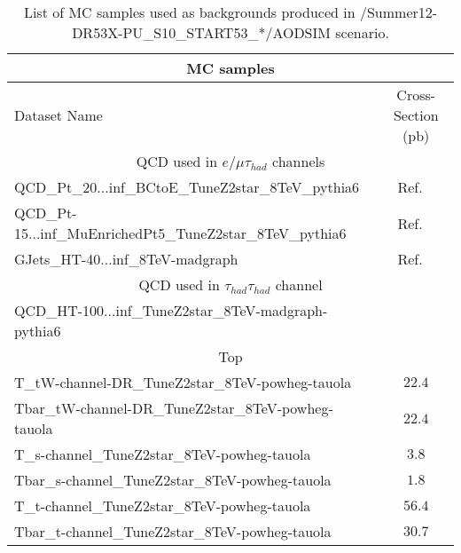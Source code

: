 \begin{table}[!Hhtb]
\begin{center}
\small{
\caption{List of MC samples used as backgrounds produced in /Summer12-DR53X-PU\_S10\_START53\_*/AODSIM scenario.}
\begin{tabular}{|l|c|}
\hline\hline
\multicolumn{2}{|c|}{MC samples } \\
\hline\hline
Dataset Name                                            & Cross-Section (pb)    \\
\hline\hline
\multicolumn{2}{|c|}{QCD used in $e/\mu\tau_{had}$ channels }\\
\hline\hline
QCD\_Pt\_20...inf\_BCtoE\_TuneZ2star\_8TeV\_pythia6                & Ref. ~\cite{Prep}\\ 
QCD\_Pt-15...inf\_MuEnrichedPt5\_TuneZ2star\_8TeV\_pythia6         & Ref. ~\cite{Prep}\\
GJets\_HT-40...inf\_8TeV-madgraph                                  & Ref. ~\cite{Prep}\\
\hline\hline
\multicolumn{2}{|c|}{QCD used in $\tau_{had}\tau_{had}$ channel }\\
\hline\hline
QCD\_HT-100...inf\_TuneZ2star\_8TeV-madgraph-pythia6            &\\
\hline\hline

\multicolumn{2}{|c|}{Top }\\
\hline\hline
T\_tW-channel-DR\_TuneZ2star\_8TeV-powheg-tauola       & $22.4$                \\
Tbar\_tW-channel-DR\_TuneZ2star\_8TeV-powheg-tauola    & $22.4$\\
T\_s-channel\_TuneZ2star\_8TeV-powheg-tauola           & $3.8$\\%
Tbar\_s-channel\_TuneZ2star\_8TeV-powheg-tauola        & $1.8$\\%
T\_t-channel\_TuneZ2star\_8TeV-powheg-tauola           & $56.4$\\
Tbar\_t-channel\_TuneZ2star\_8TeV-powheg-tauola        & $30.7$\\


\end{tabular}}
\end{center}
\end{table}

